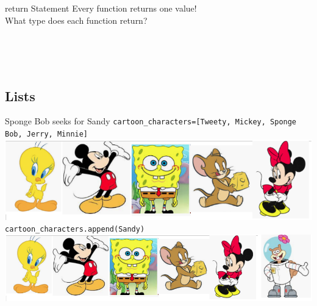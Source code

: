         \begin{frame}{return Statement}
            \Large
            Every function returns one value!\\
            \pause
            What type does each function return?
            \normalsize
            \begin{columns}
                \begin{column}{0.35\textwidth}
                    \pause
                    \inputminted[frame=single, framesep=2pt]{python3}{code-examples/return_int.py}
                \end{column}
                \begin{column}{0.6\textwidth}
                    \pause
                    \inputminted[frame=single, framesep=2pt]{python3}{code-examples/return_string.py}
                \end{column}
            \end{columns}  
        \pause
            \inputminted[frame=single, framesep=2pt]{python3}{code-examples/return_none.py}
            \pause
            \inputminted[frame=single, framesep=2pt]{python3}{code-examples/return_list.py}
        \end{frame}
    
    \subsection{Lists}
    \begin{frame}{Sponge Bob seeks for Sandy}
        \pause
        \texttt{cartoon\_characters=[\textquotesingle Tweety\textquotesingle , \textquotesingle Mickey\textquotesingle , \textquotesingle Sponge Bob\textquotesingle , \textquotesingle Jerry\textquotesingle , \textquotesingle Minnie\textquotesingle ]}\\
        \includegraphics[width=.80\textwidth]{images/list_cartoons/list0.png}   
        \pause
        \texttt{cartoon\_characters.append(\textquotesingle Sandy\textquotesingle )}\\
        \pause
        \includegraphics[width=.95\textwidth]{images/list_cartoons/list_after_append.png}       
    \end{frame}

